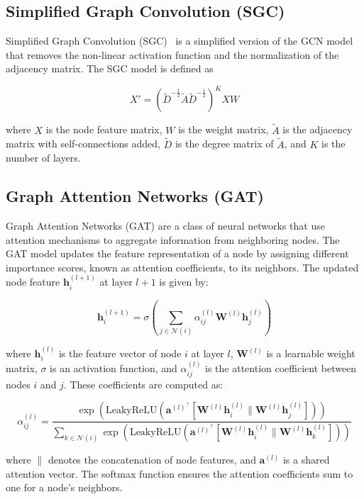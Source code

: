 \subsection{Simplified Graph Convolution (SGC)}

Simplified Graph Convolution (SGC)~\cite{wu2019simplifying} is a simplified version of the GCN model that removes the non-linear activation function and the normalization of the adjacency matrix. The SGC model is defined as

$$
 X' = (\tilde{D}^{-\frac{1}{2}}\tilde{A}\tilde{D}^{-\frac{1}{2}})^K XW
$$

where $X$ is the node feature matrix, $W$ is the weight matrix, $\tilde{A}$ is the adjacency matrix with self-connections added, $\tilde{D}$ is the degree matrix of $\tilde{A}$, and $K$ is the number of layers. 


\subsection{Graph Attention Networks (GAT)}
Graph Attention Networks (GAT) are a class of neural networks that use attention mechanisms to aggregate information from neighboring nodes. The GAT model updates the feature representation of a node by assigning different importance scores, known as attention coefficients, to its neighbors. The updated node feature $\mathbf{h}_i^{(l+1)}$ at layer $l+1$ is given by:

$$
\mathbf{h}_i^{(l+1)} = \sigma \left( \sum_{j \in \mathcal{N}(i)} \alpha_{ij}^{(l)} \mathbf{W}^{(l)} \mathbf{h}_j^{(l)} \right)
$$

where $\mathbf{h}_i^{(l)}$ is the feature vector of node $i$ at layer $l$, $\mathbf{W}^{(l)}$ is a learnable weight matrix, $\sigma$ is an activation function, and $\alpha_{ij}^{(l)}$ is the attention coefficient between nodes $i$ and $j$. These coefficients are computed as:

$$
\alpha_{ij}^{(l)} = \frac{\exp \left( \textrm{LeakyReLU} \left( \mathbf{a}^{(l)^\top} [\mathbf{W}^{(l)} \mathbf{h}_i^{(l)} \| \mathbf{W}^{(l)} \mathbf{h}_j^{(l)}] \right) \right)}{\sum_{k \in \mathcal{N}(i)} \exp \left( \textrm{LeakyReLU} \left( \mathbf{a}^{(l)^\top} [\mathbf{W}^{(l)} \mathbf{h}_i^{(l)} \| \mathbf{W}^{(l)} \mathbf{h}_k^{(l)}] \right) \right)}
$$

where $\|$ denotes the concatenation of node features, and $\mathbf{a}^{(l)}$ is a shared attention vector. The softmax function ensures the attention coefficients sum to one for a node's neighbors.

